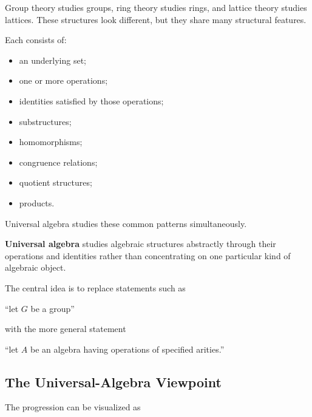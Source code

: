 Group theory studies groups, ring theory studies rings, and lattice theory
studies lattices. These structures look different, but they share many
structural features.

Each consists of:

\begin{itemize}
    \item an underlying set;
    \item one or more operations;
    \item identities satisfied by those operations;
    \item substructures;
    \item homomorphisms;
    \item congruence relations;
    \item quotient structures;
    \item products.
\end{itemize}

Universal algebra studies these common patterns simultaneously.

\begin{conceptbox}
\textbf{Universal algebra} studies algebraic structures abstractly through
their operations and identities rather than concentrating on one particular
kind of algebraic object.
\end{conceptbox}

The central idea is to replace statements such as

``let \(G\) be a group''

with the more general statement

``let \(A\) be an algebra having operations of specified arities.''

\subsection{The Universal-Algebra Viewpoint}
\label{subsec:universal-algebra-viewpoint}

The progression can be visualized as

\begin{center}
\end{center}

